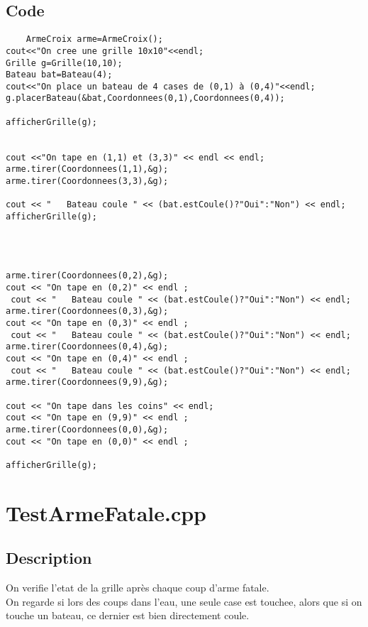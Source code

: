         \subsection{Code}
\begin{lstlisting}
	ArmeCroix arme=ArmeCroix();
cout<<"On cree une grille 10x10"<<endl;
Grille g=Grille(10,10);
Bateau bat=Bateau(4);
cout<<"On place un bateau de 4 cases de (0,1) à (0,4)"<<endl;
g.placerBateau(&bat,Coordonnees(0,1),Coordonnees(0,4));

afficherGrille(g);


cout <<"On tape en (1,1) et (3,3)" << endl << endl;
arme.tirer(Coordonnees(1,1),&g);
arme.tirer(Coordonnees(3,3),&g);

cout << "   Bateau coule " << (bat.estCoule()?"Oui":"Non") << endl;
afficherGrille(g);




arme.tirer(Coordonnees(0,2),&g);
cout << "On tape en (0,2)" << endl ; 
 cout << "   Bateau coule " << (bat.estCoule()?"Oui":"Non") << endl;
arme.tirer(Coordonnees(0,3),&g);
cout << "On tape en (0,3)" << endl ; 
 cout << "   Bateau coule " << (bat.estCoule()?"Oui":"Non") << endl;
arme.tirer(Coordonnees(0,4),&g);
cout << "On tape en (0,4)" << endl ; 
 cout << "   Bateau coule " << (bat.estCoule()?"Oui":"Non") << endl;
arme.tirer(Coordonnees(9,9),&g);

cout << "On tape dans les coins" << endl;
cout << "On tape en (9,9)" << endl ; 
arme.tirer(Coordonnees(0,0),&g);
cout << "On tape en (0,0)" << endl ; 

afficherGrille(g);
	\end{lstlisting}
    \section{TestArmeFatale.cpp}
        \subsection{Description}
            On verifie l'etat de la grille après chaque coup d'arme fatale.\\
            On regarde si lors des coups dans l'eau, une seule case est touchee, alors que si on touche un bateau, ce dernier est bien directement coule.
